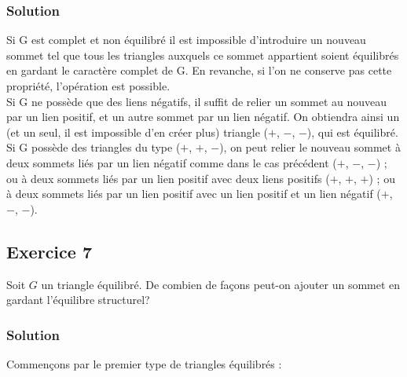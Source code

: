     \subsubsection*{Solution}
    Si G est complet et non équilibré il est impossible d’introduire un nouveau sommet tel que tous les triangles auxquels ce sommet appartient soient équilibrés en gardant le caractère complet de G.
    En revanche, si l'on ne conserve pas cette propriété, l'opération est possible.\\
    Si G ne possède que des liens négatifs, il suffit de relier un sommet au nouveau par un lien positif, et un autre sommet par un lien négatif.
    On obtiendra ainsi un (et un seul, il est impossible d'en créer plus) triangle ($+$, $-$, $-$), qui est équilibré.\\
    Si G possède des triangles du type ($+$, $+$, $-$), on peut relier le nouveau sommet à deux sommets liés par un lien négatif comme dans le cas précédent ($+$, $-$, $-$) ; ou à deux sommets liés par un lien positif avec deux liens positifs ($+$, $+$, $+$) ; ou à deux sommets liés par un lien positif avec un lien positif et un lien négatif ($+$, $-$, $-$).


\subsection*{Exercice 7}
Soit $G$ un triangle \'{e}quilibr\'{e}. De combien de fa\c{c}ons peut-on ajouter un sommet en gardant l'\'{e}quilibre structurel?

    \subsubsection*{Solution}
    Commençons par le premier type de triangles équilibrés :
    \begin{center}
    \end{center}

